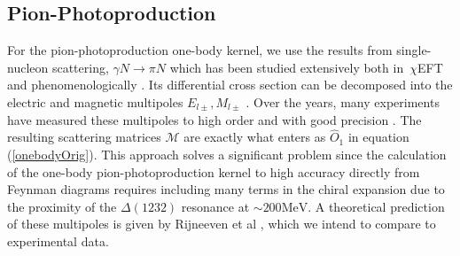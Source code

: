 \documentclass[a4paper,11pt]{article}
\newcommand{\MeV}{\mathrm{MeV}}
\newcommand{\ChiEFT}{\,$\chi$EFT\,\,}
\begin{document}
\subsection{Pion-Photoproduction}
For the pion-photoproduction one-body kernel, we use the results from
single-nucleon scattering, $\gamma N \to \pi N$ which has
been studied extensively both in \ChiEFT and phenomenologically \cite{pionphoto,
Rijneveen2021,Workman2012,Briscoe2023}.
Its differential cross section can be decomposed into the
electric and magnetic multipoles $E_{l\pm}, M_{l\pm}$ \cite{pionphoto}.
Over the years, many experiments have measured
these multipoles to high order and with good precision
\cite{multipolePionPion}.
The resulting scattering matrices $\mathcal{M}$ are exactly what
enters as $\hat{O}_1$ in equation (\ref{onebodyOrig}).
This approach solves a significant problem since the calculation of
the one-body pion-photoproduction kernel
to high accuracy directly from Feynman diagrams requires including many terms
in the chiral expansion due to the proximity of the $\Delta(1232)$ resonance at $\sim 200\MeV$.
A theoretical prediction of these multipoles is given by Rijneeven et al \cite{Rijneveen2021}, which we intend to compare 
to experimental data.
\end{document}
